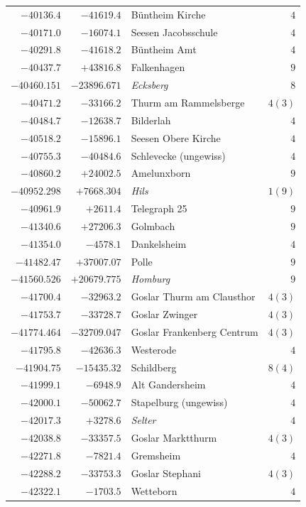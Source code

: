 \begin{center}
\begin{tabular}{r|r|p{170pt}|r}
\(-40136.4\)&\(-41619.4\)&Büntheim Kirche&\(4\)\\
\(-40171.0\)&\(-16074.1\)&Seesen Jacobsschule&\(4\)\\
\(-40291.8\)&\(-41618.2\)&Büntheim Amt&\(4\)\\
\(-40437.7\)&\(+43816.8\)&Falkenhagen&\(9\)\\
\(-40460.151\)&\(-23896.671\)&\textit{Ecksberg}&\(8\)\\
\(-40471.2\)&\(-33166.2\)&Thurm am Rammelsberge&\(4 (3)\)\\
\(-40484.7\)&\(-12638.7\)&Bilderlah&\(4\)\\
\(-40518.2\)&\(-15896.1\)&Seesen Obere Kirche&\(4\)\\
\(-40755.3\)&\(-40484.6\)&Schlevecke (ungewiss)&\(4\)\\
\(-40860.2\)&\(+24002.5\)&Amelunxborn&\(9\)\\
\(-40952.298\)&\(+7668.304\)&\textit{Hils}&\(1 (9)\)\\
\(-40961.9\)&\(+2611.4\)&Telegraph 25&\(9\)\\
\(-41340.6\)&\(+27206.3\)&Golmbach&\(9\)\\
\(-41354.0\)&\(-4578.1\)&Dankelsheim&\(4\)\\
\(-41482.47\)&\(+37007.07\)&Polle&\(9\)\\
\(-41560.526\)&\(+20679.775\)&\textit{Homburg}&\(9\)\\
\(-41700.4\)&\(-32963.2\)&Goslar Thurm am Clausthor&\(4 (3)\)\\
\(-41753.7\)&\(-33728.7\)&Goslar Zwinger&\(4 (3)\)\\
\(-41774.464\)&\(-32709.047\)&Goslar Frankenberg Centrum&\(4 (3)\)\\
\(-41795.8\)&\(-42636.3\)&Westerode&\(4\)\\
\(-41904.75\)&\(-15435.32\)&Schildberg&\(8 (4)\)\\
\(-41999.1\)&\(-6948.9\)&Alt Gandersheim&\(4\)\\
\(-42000.1\)&\(-50062.7\)&Stapelburg (ungewiss)&\(4\)\\
\(-42017.3\)&\(+3278.6\)&\textit{Selter}&\(4\)\\
\(-42038.8\)&\(-33357.5\)&Goslar Marktthurm&\(4 (3)\)\\
\(-42271.8\)&\(-7821.4\)&Gremsheim&\(4\)\\
\(-42288.2\)&\(-33753.3\)&Goslar Stephani&\(4 (3)\)\\
\(-42322.1\)&\(-1703.5\)&Wetteborn&\(4\)\\
\hline\end{tabular}\endgroup\end{center}

